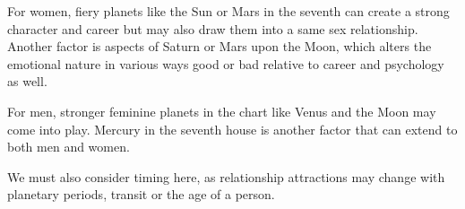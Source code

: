 For women, fiery planets like the Sun or Mars in the seventh can create a strong character and career but may also draw them into a same sex relationship. Another factor is aspects of Saturn or Mars upon the Moon, which alters the emotional nature in various ways good or bad relative to career and psychology as well.

 

For men, stronger feminine planets in the chart like Venus and the Moon may come into play. Mercury in the seventh house is another factor that can extend to both men and women.

 

We must also consider timing here, as relationship attractions may change with planetary periods, transit or the age of a person.